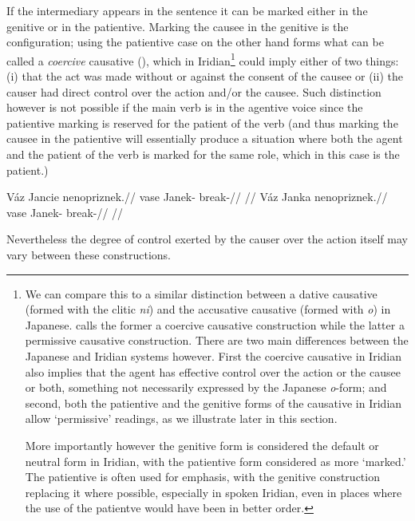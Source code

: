 If the intermediary appears in the sentence it can be marked either in the genitive or in the patientive. Marking the causee in the genitive is the  configuration; using the patientive case on the other hand forms what can be called a \emph{coercive} causative (\cite{shibatani1990,lehmann2006}), which in Iridian\footnote{We can compare this to a similar distinction between a dative causative (formed with the clitic \emph{ni}) and the accusative causative (formed with \emph{o}) in Japanese. \textcite{lehmann2006} calls the former a coercive causative construction while the latter a permissive causative construction. There are two main differences between the Japanese and Iridian systems however. First the coercive causative in Iridian also implies that the agent has effective control over the action or the causee or both, something not necessarily expressed by the Japanese \emph{o}-form; and second, both the patientive and the genitive forms of the causative in Iridian allow `permissive' readings, as we illustrate later in this section.

More importantly however the genitive form is considered the default or neutral form in Iridian, with the patientive form considered as more `marked.' The patientive is often used for emphasis, with the genitive construction replacing it where possible, especially in spoken Iridian, even in places where the use of the patientve would have been in better order.
}
could imply either of two things: (i) that the act was made without or against the consent of the causee or (ii) the causer had direct control over the action and/or the causee. Such distinction however is not possible if the main verb is in the agentive voice since the patientive marking is reserved for the patient of the verb (and thus marking the causee in the patientive will essentially produce a situation where both the agent and the patient of the verb is marked for the same role, which in this case is the patient.)

\pex
\a
\begingl
\gla V\'az Jancie nenopriznek.//
\glb vase Janek- break-//
\glft {}//
\endgl
\a
\begingl
\gla V\'az Janka nenopriznek.//
\glb vase Janek- break-//
\glft {}//
\endgl
\xe




Nevertheless the degree of control exerted by the causer over the action itself may vary between these constructions.

